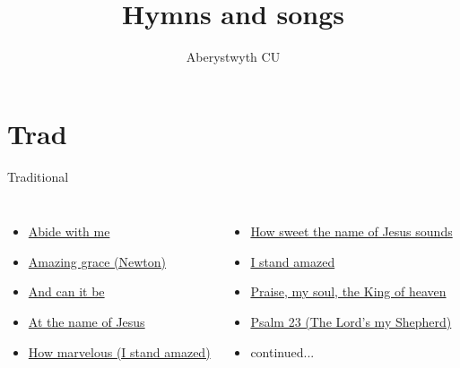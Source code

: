 \documentclass{beamer}
\title{Hymns and songs}
\author{Aberystwyth CU}
\date{}
\begin{document}
\maketitle
\section{Trad}

\begin{frame}[t]{Traditional}
\begin{columns}[t]
        \begin{itemize}
    \item \hyperlink{Abide with me[]}{Abide with me } \phantom{ 1 1 1 1 1 1 1 1 1 1 1}
    \item \hyperlink{Amazing grace[](Newton)}{Amazing grace (Newton)} \phantom{ 1 1 1 1 1 1 1}
            \item \hyperlink{And can it be[]}{And can it be } \phantom{ 1 1 1 1 1 1 1 1 1 1 1}
                    \item \hyperlink{At the name of Jesus[]}{At the name of Jesus } \phantom{ 1 1 1 1 1 1 1}
            \item \hyperlink{I stand amazed['How marvelous']}{How marvelous (I stand amazed)} \phantom{ 1 1 1}
\end{itemize}
        \begin{itemize}
                    \item \hyperlink{How sweet the name of Jesus sounds[]}{How sweet the name of Jesus sounds } \phantom{}
                    \item \hyperlink{I stand amazed['How marvelous']}{I stand amazed } \phantom{ 1 1 1 1 1 1 1 1 1 1}
            \item \hyperlink{Praise, my soul, the King of heaven[]}{Praise, my soul, the King of heaven } \phantom{}
    \item \hyperlink{The Lord's my Shepherd['Psalm 23'](Trad)}{Psalm 23 (The Lord's my Shepherd)} \phantom{ 1}
    \item[] continued...
            \end{itemize}
            \end{columns}
            \end{frame}
\end{document}
